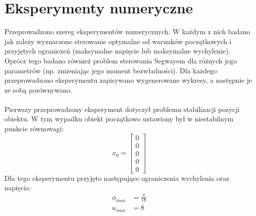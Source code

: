 \section{Eksperymenty numeryczne}
\label{eksperymenty_numeryczne}

Przeprowadzono szereg eksperymentów numerycznych. W każdym z nich badano jak zależy wyznaczone sterowanie optymalne od warunków początkowych i przyjętych ograniczeń (maksymalne napięcie lub maksymalne wychylenie). Oprócz tego badano również problem sterowania Segwayem dla różnych jego parametrów (np. zmieniając jego moment bezwładności). Dla każdego przeprowadzono eksperymentu zapisywano wygenerowane wykresy, a następnie je ze sobą porównywano.
\paragraph*{}
Pierwszy przeprowadzony eksperyment dotyczył problemu stabilizacji pozycji obiektu. W tym wypadku obiekt początkowo ustawiony był w niestabilnym punkcie równowagi:
\begin{equation}
x_0=\begin{bmatrix}
0\\
0\\
0\\
0\\
0
\end{bmatrix}
\end{equation}
Dla tego eksperymentu przyjęto następujące ograniczenia wychylenia oraz napięcia:
\begin{equation}
\begin{aligned}
\phi_{max}&=\frac{\pi}{18}\\
u_{max}&=8
\end{aligned}
\end{equation}


